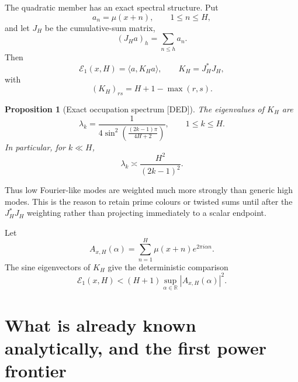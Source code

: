 \documentclass[11pt]{amsart}
\numberwithin{equation}{section}
\theoremstyle{plain}
\newtheorem{proposition}[theorem]{Proposition}
\theoremstyle{definition}
\theoremstyle{remark}
\newcommand{\Mob}{\mu}
\newcommand{\R}{\mathbb R}
\newcommand{\DED}{\textup{[DED]}}
\begin{document}
The quadratic member has an exact spectral structure.  Put
\begin{equation}
a_n=\Mob(x+n),\qquad 1\le n\le H,
\label{eq:increment-vector}
\end{equation}
and let $J_H$ be the cumulative-sum matrix,
\begin{equation}
(J_Ha)_h=\sum_{n\le h}a_n.
\label{eq:summation-matrix}
\end{equation}
Then
\begin{equation}
\mathcal E_1(x,H)=\langle a,K_Ha\rangle,
\qquad K_H=J_H^*J_H,
\label{eq:quadratic-kernel}
\end{equation}
with
\begin{equation}
(K_H)_{rs}=H+1-\max(r,s).
\label{eq:quadratic-kernel-entries}
\end{equation}

\begin{proposition}[Exact occupation spectrum \DED]
\label{prop:occupation-spectrum}
The eigenvalues of $K_H$ are
\begin{equation}
\lambda_k=
\frac{1}{4\sin^2\!\left(\frac{(2k-1)\pi}{4H+2}\right)},
\qquad 1\le k\le H.
\label{eq:occupation-eigenvalues}
\end{equation}
In particular, for $k\ll H$,
\begin{equation}
\lambda_k\asymp\frac{H^2}{(2k-1)^2}.
\label{eq:low-mode-weight}
\end{equation}
\end{proposition}

Thus low Fourier-like modes are weighted much more strongly than generic high modes.  This is the
reason to retain prime colours or twisted sums until after the $J_H^*J_H$ weighting rather than
projecting immediately to a scalar endpoint.

Let
\begin{equation}
A_{x,H}(\alpha)=\sum_{n=1}^{H}\Mob(x+n)e^{2\pi i\alpha n}.
\label{eq:short-twisted-mobius}
\end{equation}
The sine eigenvectors of $K_H$ give the deterministic comparison
\begin{equation}
\boxed{
\mathcal E_1(x,H)<
(H+1)\sup_{\alpha\in\R}|A_{x,H}(\alpha)|^2.}
\label{eq:energy-twist-bound}
\end{equation}

\section{What is already known analytically, and the first power frontier}
\label{sec:known-analytic-frontier}
\end{document}
